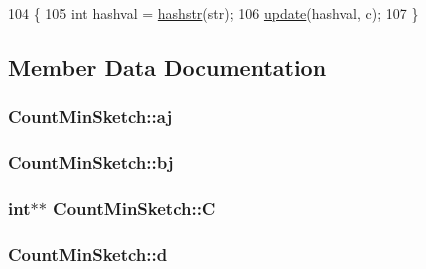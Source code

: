 \begin{DoxyCode}
104         \{
105             \textcolor{keywordtype}{int} hashval = \hyperlink{classCountMinSketch_ad60583d0353b1c5c10d927a66806da14}{hashstr}(str);
106             \hyperlink{classCountMinSketch_a3f6bcbf75a945ca7ccda17991ef145c3}{update}(hashval, c);
107         \}
\end{DoxyCode}


\subsection{Member Data Documentation}
\subsubsection[{\texorpdfstring{aj}{aj}}]{ Count\+Min\+Sketch\+::aj\hspace{0.3cm}{\ttfamily [private]}}\hypertarget{classCountMinSketch_a388d09d1902a17d772916eb289ef6306}{}\label{classCountMinSketch_a388d09d1902a17d772916eb289ef6306}
\subsubsection[{\texorpdfstring{bj}{bj}}]{ Count\+Min\+Sketch\+::bj\hspace{0.3cm}{\ttfamily [private]}}\hypertarget{classCountMinSketch_aededfa6cb03c61f49030320d5703e5ea}{}\label{classCountMinSketch_aededfa6cb03c61f49030320d5703e5ea}
\subsubsection[{\texorpdfstring{C}{C}}]{\setlength{\rightskip}{0pt plus 5cm}int$\ast$$\ast$ Count\+Min\+Sketch\+::C\hspace{0.3cm}{\ttfamily [private]}}\hypertarget{classCountMinSketch_a6c911115ef4787d8825b7e2a39a64384}{}\label{classCountMinSketch_a6c911115ef4787d8825b7e2a39a64384}
\subsubsection[{\texorpdfstring{d}{d}}]{ Count\+Min\+Sketch\+::d\hspace{0.3cm}{\ttfamily [private]}}\hypertarget{classCountMinSketch_a385cf84231f967214bf6f71c6106f33e}{}\label{classCountMinSketch_a385cf84231f967214bf6f71c6106f33e}
